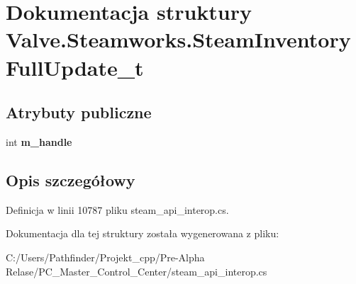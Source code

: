 \hypertarget{struct_valve_1_1_steamworks_1_1_steam_inventory_full_update__t}{}\section{Dokumentacja struktury Valve.\+Steamworks.\+Steam\+Inventory\+Full\+Update\+\_\+t}
\label{struct_valve_1_1_steamworks_1_1_steam_inventory_full_update__t}
\subsection*{Atrybuty publiczne}
\begin{DoxyCompactItemize}
\item 
\mbox{\label{struct_valve_1_1_steamworks_1_1_steam_inventory_full_update__t_af0387b4232e468a7de78af160fc0f73b}} 
int {\bfseries m\+\_\+handle}
\end{DoxyCompactItemize}


\subsection{Opis szczegółowy}


Definicja w linii 10787 pliku steam\+\_\+api\+\_\+interop.\+cs.



Dokumentacja dla tej struktury została wygenerowana z pliku\+:\begin{DoxyCompactItemize}
\item 
C\+:/\+Users/\+Pathfinder/\+Projekt\+\_\+cpp/\+Pre-\/\+Alpha Relase/\+P\+C\+\_\+\+Master\+\_\+\+Control\+\_\+\+Center/steam\+\_\+api\+\_\+interop.\+cs\end{DoxyCompactItemize}
